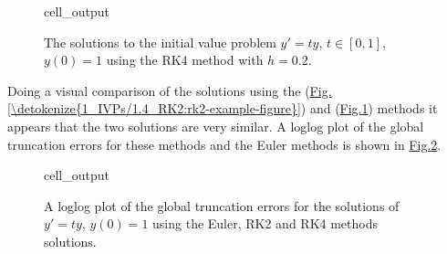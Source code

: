 \documentclass[letterpaper,10pt,english]{jupyterBook}
\begin{document}
\begin{figure}[htbp]
\centering
\capstart
\begin{sphinxVerbatimOutput}

\begin{sphinxuseclass}{cell_output}
\noindent{}

\end{sphinxuseclass}\end{sphinxVerbatimOutput}
\caption{The solutions to the initial value problem \(y'=ty\), \(t\in[0,1]\), \(y(0)=1\) using the RK4 method with \(h=0.2\).}\label{\detokenize{2_ERKs/2.3_Solving_IVPs_using_ERK_methods:rk4-example-figure}}\end{figure}

\sphinxAtStartPar
Doing a visual comparison of the solutions using the {\hyperref[\detokenize{1_IVPs/1.4_RK2:rk2-definition}]{}} (\hyperref[\detokenize{1_IVPs/1.4_RK2:rk2-example-figure}]{Fig.\@ \ref{\detokenize{1_IVPs/1.4_RK2:rk2-example-figure}}}) and {\hyperref[\detokenize{2_ERKs/2.2_RK4_Derivation:rk4-definition}]{}} (\hyperref[\detokenize{2_ERKs/2.3_Solving_IVPs_using_ERK_methods:rk4-example-figure}]{Fig.\@ \ref{\detokenize{2_ERKs/2.3_Solving_IVPs_using_ERK_methods:rk4-example-figure}}}) methods it appears that the two solutions are very similar. A loglog plot of the global truncation errors for these methods and the Euler methods is shown in \hyperref[\detokenize{2_ERKs/2.3_Solving_IVPs_using_ERK_methods:rk4-gte-plot-figure}]{Fig.\@ \ref{\detokenize{2_ERKs/2.3_Solving_IVPs_using_ERK_methods:rk4-gte-plot-figure}}}.

\begin{figure}[htbp]
\centering
\capstart
\begin{sphinxVerbatimOutput}

\begin{sphinxuseclass}{cell_output}
\noindent{}

\end{sphinxuseclass}\end{sphinxVerbatimOutput}
\caption{A loglog plot of the global truncation errors for the solutions of \(y'=ty\), \(y(0)=1\) using the Euler, RK2 and RK4 methods solutions.}\label{\detokenize{2_ERKs/2.3_Solving_IVPs_using_ERK_methods:rk4-gte-plot-figure}}\end{figure}
\end{document}
